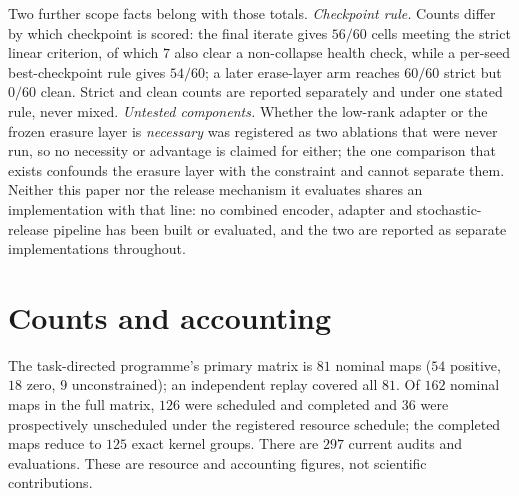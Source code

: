 \documentclass[conference]{IEEEtran}
\begin{document}
Two further scope facts belong with those totals. \emph{Checkpoint rule.} Counts differ by which
checkpoint is scored: the final iterate gives $56/60$ cells meeting the strict linear criterion, of which
$7$ also clear a non-collapse health check, while a per-seed best-checkpoint rule gives $54/60$; a later
erase-layer arm reaches $60/60$ strict but $0/60$ clean. Strict and clean counts are reported separately
and under one stated rule, never mixed. \emph{Untested components.} Whether the low-rank adapter or the
frozen erasure layer is \emph{necessary} was registered as two ablations that were never run, so no
necessity or advantage is claimed for either; the one comparison that exists confounds the erasure layer
with the constraint and cannot separate them. Neither this paper nor the release mechanism it evaluates
shares an implementation with that line: no combined encoder, adapter and stochastic-release pipeline has
been built or evaluated, and the two are reported as separate implementations throughout.

\section{Counts and accounting}
\label{app:counts}
The task-directed programme's primary matrix is $81$ nominal maps ($54$ positive, $18$ zero, $9$
unconstrained); an independent replay covered all $81$. Of $162$ nominal maps in the full matrix, $126$
were scheduled and completed and $36$ were prospectively unscheduled under the registered resource
schedule; the completed maps reduce to $125$ exact kernel groups. There are $297$ current audits and
evaluations. These are resource and accounting figures, not scientific contributions.
\end{document}
